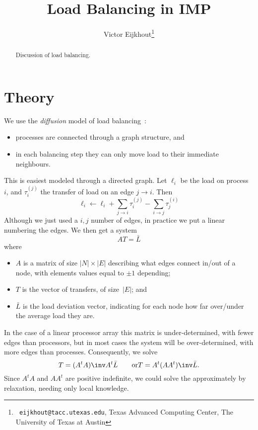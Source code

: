 \documentclass[11pt,fleqn,preprint]{impreport}
\title[Load balancing]{Load Balancing in IMP}
\author[Eijkhout]{Victor Eijkhout\thanks{{\tt
      eijkhout@tacc.utexas.edu}, Texas Advanced Computing
    Center, The University of Texas at Austin}}
\begin{document}
\maketitle

\begin{abstract}
 Discussion of load balancing.
\end{abstract}

\acresetall

\section{Theory}

We use the
\emph{diffusion}
model of load balancing~\cite{Cybenko:1989:balancing,HuBlake:diffusion1999}:
\begin{itemize}
\item processes are connected through a graph structure, and
\item in each balancing step they can only move load to their
  immediate neighbours.
\end{itemize}

This is easiest modeled through a directed graph. Let $\ell_i$ be the
load on process~$i$, and $\tau^{(j)}_i$ the transfer of load on an edge
$j\rightarrow i$. Then
\[ \ell_i \leftarrow \ell_i
    + \sum_{j\rightarrow i} \tau^{(j)}_i
    - \sum_{i\rightarrow j} \tau^{(i)}_j
\]
Although we just used a $i,j$ number of edges, in practice
we put a linear numbering the edges. We then get a system
\[ AT=\bar L \]
where
\begin{itemize}
\item $A$ is a matrix of size $|N|\times|E|$ describing what edges
  connect in/out of a node, with elements values equal to $\pm1$ depending;
\item $T$ is the vector of transfers, of size~$|E|$; and
\item $\bar L$ is the load deviation vector, indicating for each node
  how far over/under the average load they are.
\end{itemize}

In the case of a linear processor array this matrix is
under-determined, with fewer edges than processors, but in most cases the
system will be over-determined, with more edges than processes.
Consequently, we solve
%
\[ T= (A^tA)\inv A^t\bar L \qquad\hbox{or} T=A^t(AA^t)\inv \bar L. \]
%
Since $A^tA$ and $AA^t$ are positive indefinite, we could solve the
approximately by relaxation, needing only local knowledge.
\end{document}
